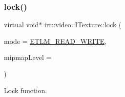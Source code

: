 \subsubsection{\texorpdfstring{lock()}{lock()}\hspace{0.1cm}{\footnotesize\ttfamily [1/2]}}
{\footnotesize\ttfamily virtual void$\ast$ irr\+::video\+::\+I\+Texture\+::lock (\begin{DoxyParamCaption}\item[{\hyperlink{namespaceirr_1_1video_a3916d259e8fe0d0d02e8ee0adc8af5bc}{E\+\_\+\+T\+E\+X\+T\+U\+R\+E\+\_\+\+L\+O\+C\+K\+\_\+\+M\+O\+DE}}]{mode = {\ttfamily \hyperlink{namespaceirr_1_1video_a3916d259e8fe0d0d02e8ee0adc8af5bcad742bd0e885e6a08c86b8d3d5c601952}{E\+T\+L\+M\+\_\+\+R\+E\+A\+D\+\_\+\+W\+R\+I\+TE}},  }\item[{\hyperlink{namespaceirr_a0416a53257075833e7002efd0a18e804}{u32}}]{mipmap\+Level = {} }\end{DoxyParamCaption})\hspace{0.3cm}{\ttfamily [pure virtual]}}



Lock function. 

